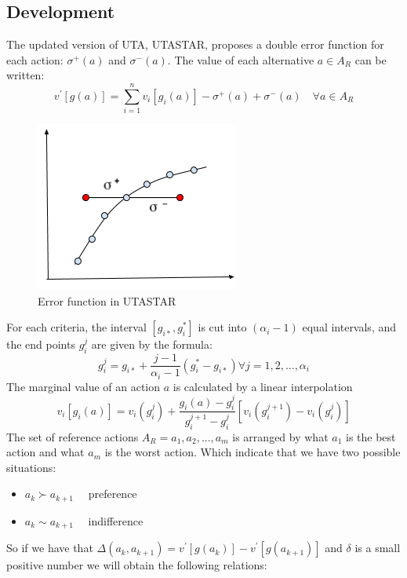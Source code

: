 \documentclass{report}
\begin{document}
\subsection{Development} 
The updated version of UTA, UTASTAR, proposes a double error function for each action: $\sigma ^{+} (a)$ and $\sigma ^{-} (a)$. The value of each alternative $a \in A_R$ can be written: \\
\begin{equation}
v^{'} [g(a)] = \sum_{i=1}^{n} v_i [g_i (a)] - \sigma ^{+} (a)+ \sigma ^{-} (a) \quad \forall a \in A_R
\end{equation}
\begin{figure}[H]
\centering
\includegraphics{error-function-utastar}
\caption{Error function in UTASTAR}
\end{figure}
For each criteria, the interval $[g_{i*}, g_i^{*}]$ is cut into $(\alpha _i -1)$ equal intervals, and the end points $g_i^{j}$ are given by the formula:
\begin{equation}
g_i^{j}= g_{i*} + \frac{j-1}{\alpha _i -1} (g_i^{*} - g_{i*}) \forall j = 1,2, ..., \alpha _i
\end{equation}
The marginal value of an action $a$ is calculated by a linear interpolation
\begin{equation}
v_i [g_i (a)] = v_i (g_i^{j}) + \frac{g_i (a) - g_i^{j}}{ g_i^{j+1} - g_i^{j}} [v_i (g_i^{j+1}) - v_i (g_i^{j}) ] 
\end{equation}
The set of reference actions $ A_R = a_1, a_2, ... , a_m$ is arranged by what $a_1$ is the best action and what $a_m$ is the worst action. Which indicate that we have two possible situations:
\begin{itemize}
\item $a_k \succ a_{k+1} \quad $ preference 
\item $a_k \sim a_{k+1} \quad $ indifference
\end{itemize} 
So if we have that $\Delta (a_k, a_{k+1} ) = v^{'} [g(a_k)] - v^{'} [g(a_{k+1})]$ and $\delta$ is a small positive number we will obtain the following relations: 
\end{document}
